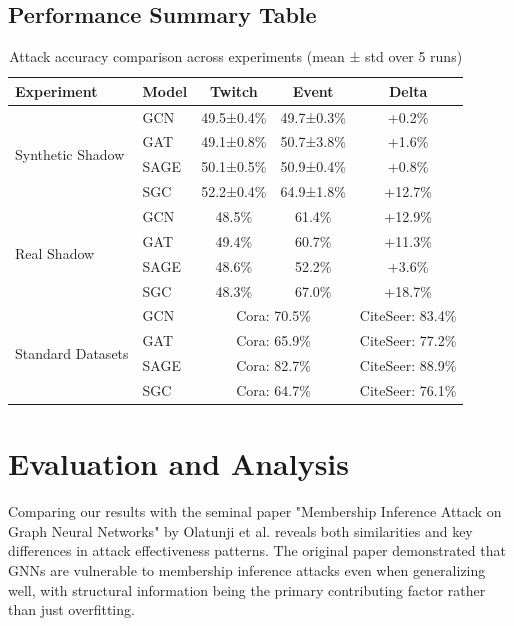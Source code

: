 \documentclass{article}
\begin{document}
\subsection{Performance Summary Table}

\begin{table}[H]
\centering
\caption{Attack accuracy comparison across experiments (mean ± std over 5 runs)}
\label{tab:performance}
\begin{tabular}{|l|l|c|c|c|}
\hline
\textbf{Experiment} & \textbf{Model} & \textbf{Twitch} & \textbf{Event} & \textbf{Delta} \\
\hline
\multirow{4}{*}{Synthetic Shadow} & GCN & 49.5±0.4\% & 49.7±0.3\% & +0.2\% \\
 & GAT & 49.1±0.8\% & 50.7±3.8\% & +1.6\% \\
 & SAGE & 50.1±0.5\% & 50.9±0.4\% & +0.8\% \\
 & SGC & 52.2±0.4\% & 64.9±1.8\% & +12.7\% \\
\hline
\multirow{4}{*}{Real Shadow} & GCN & 48.5\% & 61.4\% & +12.9\% \\
 & GAT & 49.4\% & 60.7\% & +11.3\% \\
 & SAGE & 48.6\% & 52.2\% & +3.6\% \\
 & SGC & 48.3\% & 67.0\% & +18.7\% \\
\hline
\multirow{4}{*}{Standard Datasets} & GCN & \multicolumn{2}{c|}{Cora: 70.5\%} & CiteSeer: 83.4\% \\
 & GAT & \multicolumn{2}{c|}{Cora: 65.9\%} & CiteSeer: 77.2\% \\
 & SAGE & \multicolumn{2}{c|}{Cora: 82.7\%} & CiteSeer: 88.9\% \\
 & SGC & \multicolumn{2}{c|}{Cora: 64.7\%} & CiteSeer: 76.1\% \\
\hline
\end{tabular}
\end{table}

\section{Evaluation and Analysis}

Comparing our results with the seminal paper "Membership Inference Attack on Graph Neural Networks" by Olatunji et al. reveals both similarities and key differences in attack effectiveness patterns. The original paper demonstrated that GNNs are vulnerable to membership inference attacks even when generalizing well, with structural information being the primary contributing factor rather than just overfitting.
\end{document}
